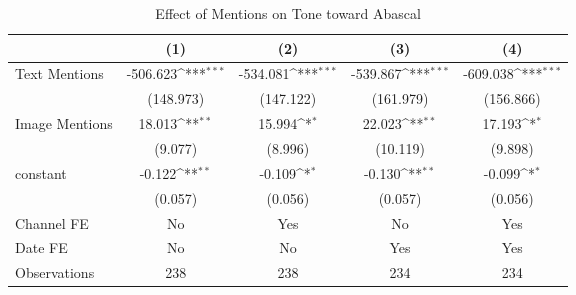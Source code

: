 \begin{table}[htbp]\centering
\def\sym#1{\ifmmode^{#1}\else\(^{#1}\)\fi}
\caption{Effect of Mentions on Tone toward Abascal}
\begin{tabular}{l*{4}{c}}
\hline\hline
                &\multicolumn{1}{c}{(1)}         &\multicolumn{1}{c}{(2)}         &\multicolumn{1}{c}{(3)}         &\multicolumn{1}{c}{(4)}         \\
\hline
Text Mentions   & -506.623\sym{***}& -534.081\sym{***}& -539.867\sym{***}& -609.038\sym{***}\\
                &(148.973)         &(147.122)         &(161.979)         &(156.866)         \\
Image Mentions  &   18.013\sym{**} &   15.994\sym{*}  &   22.023\sym{**} &   17.193\sym{*}  \\
                &  (9.077)         &  (8.996)         & (10.119)         &  (9.898)         \\
constant          &   -0.122\sym{**} &   -0.109\sym{*}  &   -0.130\sym{**} &   -0.099\sym{*}  \\
                &  (0.057)         &  (0.056)         &  (0.057)         &  (0.056)         \\
Channel FE      &       No         &      Yes         &       No         &      Yes         \\
Date FE         &       No         &       No         &      Yes         &      Yes         \\
\hline
Observations    &      238         &      238         &      234         &      234         \\
\hline\hline
\end{tabular}
\end{table}
